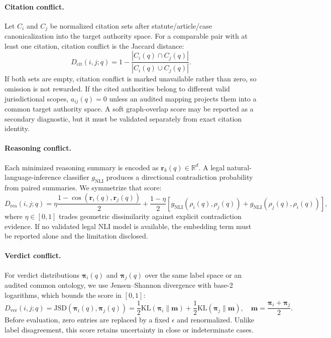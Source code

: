 \documentclass[a4paper,fleqn]{cas-sc}
\newcommand{\jsd}{\mathrm{JSD}}
\newcommand{\KL}{\mathrm{KL}}
\begin{document}
\paragraph{Citation conflict.}
Let $C_i$ and $C_j$ be normalized citation sets after statute/article/case canonicalization into the target authority space. For a comparable pair with at least one citation, citation conflict is the Jaccard distance:
\begin{equation}
    D_{\mathrm{cit}}(i,j;q) =
    1 - \dfrac{|C_i(q) \cap C_j(q)|}{|C_i(q) \cup C_j(q)|}.
\end{equation}
If both sets are empty, citation conflict is marked unavailable rather than zero, so omission is not rewarded. If the cited authorities belong to different valid jurisdictional scopes, $a_{ij}(q)=0$ unless an audited mapping projects them into a common target authority space. A soft graph-overlap score may be reported as a secondary diagnostic, but it must be validated separately from exact citation identity.

\paragraph{Reasoning conflict.}
Each minimized reasoning summary is encoded as $\bm{r}_k(q) \in \mathbb{R}^{d}$. A legal natural-language-inference classifier $g_{\mathrm{NLI}}$ produces a directional contradiction probability from paired summaries. We symmetrize that score:
\begin{equation}
    D_{\mathrm{rea}}(i,j;q) =
    \eta \frac{1 - \cos(\bm{r}_i(q),\bm{r}_j(q))}{2}
    + \frac{1-\eta}{2}\left[
    g_{\mathrm{NLI}}(\rho_i(q),\rho_j(q))
    + g_{\mathrm{NLI}}(\rho_j(q),\rho_i(q))\right],
\end{equation}
where $\eta\in[0,1]$ trades geometric dissimilarity against explicit contradiction evidence. If no validated legal NLI model is available, the embedding term must be reported alone and the limitation disclosed.

\paragraph{Verdict conflict.}
For verdict distributions $\bm{\pi}_i(q)$ and $\bm{\pi}_j(q)$ over the same label space or an audited common ontology, we use Jensen--Shannon divergence with base-2 logarithms, which bounds the score in $[0,1]$:
\begin{equation}
    D_{\mathrm{ver}}(i,j;q) =
    \jsd(\bm{\pi}_i(q),\bm{\pi}_j(q))
    = \frac{1}{2}\KL(\bm{\pi}_i \| \bm{m})
    + \frac{1}{2}\KL(\bm{\pi}_j \| \bm{m}),
    \quad \bm{m}=\frac{\bm{\pi}_i+\bm{\pi}_j}{2}.
\end{equation}
Before evaluation, zero entries are replaced by a fixed $\epsilon$ and renormalized. Unlike label disagreement, this score retains uncertainty in close or indeterminate cases.
\end{document}
